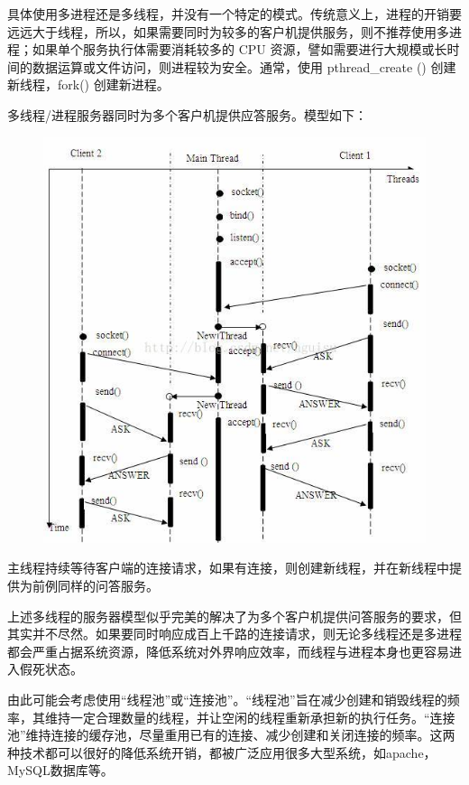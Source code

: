 \documentclass[UTF8,a4paper,8pt]{ctexbook}
\begin{document}
			具体使用多进程还是多线程，并没有一个特定的模式。传统意义上，进程的开销要远远大于线程，所以，如果需要同时为较多的客户机提供服务，则不推荐使用多进程；如果单个服务执行体需要消耗较多的 CPU 资源，譬如需要进行大规模或长时间的数据运算或文件访问，则进程较为安全。通常，使用 pthread\_create () 创建新线程，fork() 创建新进程。
			
			多线程/进程服务器同时为多个客户机提供应答服务。模型如下：
			\begin{figure}[h]
				\centering
				\includegraphics[scale = 0.8]{MultiThread.jpg}
			\end{figure}
			
			主线程持续等待客户端的连接请求，如果有连接，则创建新线程，并在新线程中提供为前例同样的问答服务。
			
			上述多线程的服务器模型似乎完美的解决了为多个客户机提供问答服务的要求，但其实并不尽然。如果要同时响应成百上千路的连接请求，则无论多线程还是多进程都会严重占据系统资源，降低系统对外界响应效率，而线程与进程本身也更容易进入假死状态。
			
			由此可能会考虑使用“线程池”或“连接池”。“线程池”旨在减少创建和销毁线程的频率，其维持一定合理数量的线程，并让空闲的线程重新承担新的执行任务。“连接池”维持连接的缓存池，尽量重用已有的连接、减少创建和关闭连接的频率。这两种技术都可以很好的降低系统开销，都被广泛应用很多大型系统，如apache，MySQL数据库等。
			
\end{document}
